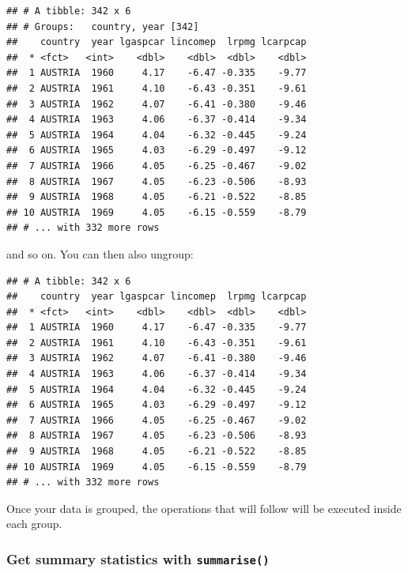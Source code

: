 \documentclass[]{gitbook}
\newenvironment{Shaded}{\begin{snugshade}}{\end{snugshade}}
\newcommand{\KeywordTok}[1]{\textcolor[rgb]{0.13,0.29,0.53}{\textbf{#1}}}
\newcommand{\NormalTok}[1]{#1}
\newcommand{\OperatorTok}[1]{\textcolor[rgb]{0.81,0.36,0.00}{\textbf{#1}}}
\newcommand{\StringTok}[1]{\textcolor[rgb]{0.31,0.60,0.02}{#1}}
\theoremstyle{definition}
\theoremstyle{definition}
\theoremstyle{definition}
\theoremstyle{remark}
\begin{document}
\begin{verbatim}
## # A tibble: 342 x 6
## # Groups:   country, year [342]
##    country  year lgaspcar lincomep  lrpmg lcarpcap
##  * <fct>   <int>    <dbl>    <dbl>  <dbl>    <dbl>
##  1 AUSTRIA  1960     4.17    -6.47 -0.335    -9.77
##  2 AUSTRIA  1961     4.10    -6.43 -0.351    -9.61
##  3 AUSTRIA  1962     4.07    -6.41 -0.380    -9.46
##  4 AUSTRIA  1963     4.06    -6.37 -0.414    -9.34
##  5 AUSTRIA  1964     4.04    -6.32 -0.445    -9.24
##  6 AUSTRIA  1965     4.03    -6.29 -0.497    -9.12
##  7 AUSTRIA  1966     4.05    -6.25 -0.467    -9.02
##  8 AUSTRIA  1967     4.05    -6.23 -0.506    -8.93
##  9 AUSTRIA  1968     4.05    -6.21 -0.522    -8.85
## 10 AUSTRIA  1969     4.05    -6.15 -0.559    -8.79
## # ... with 332 more rows
\end{verbatim}

and so on. You can then also ungroup:

\begin{Shaded}
\end{Shaded}

\begin{verbatim}
## # A tibble: 342 x 6
##    country  year lgaspcar lincomep  lrpmg lcarpcap
##  * <fct>   <int>    <dbl>    <dbl>  <dbl>    <dbl>
##  1 AUSTRIA  1960     4.17    -6.47 -0.335    -9.77
##  2 AUSTRIA  1961     4.10    -6.43 -0.351    -9.61
##  3 AUSTRIA  1962     4.07    -6.41 -0.380    -9.46
##  4 AUSTRIA  1963     4.06    -6.37 -0.414    -9.34
##  5 AUSTRIA  1964     4.04    -6.32 -0.445    -9.24
##  6 AUSTRIA  1965     4.03    -6.29 -0.497    -9.12
##  7 AUSTRIA  1966     4.05    -6.25 -0.467    -9.02
##  8 AUSTRIA  1967     4.05    -6.23 -0.506    -8.93
##  9 AUSTRIA  1968     4.05    -6.21 -0.522    -8.85
## 10 AUSTRIA  1969     4.05    -6.15 -0.559    -8.79
## # ... with 332 more rows
\end{verbatim}

Once your data is grouped, the operations that will follow will be
executed inside each group.

\hypertarget{get-summary-statistics-with-summarise}{%
\subsubsection{\texorpdfstring{Get summary statistics with
\texttt{summarise()}}{Get summary statistics with summarise()}}\label{get-summary-statistics-with-summarise}}
\end{document}
